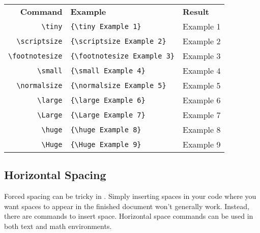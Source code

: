 \documentclass[letterpaper,twoside,10pt]{article}
\begin{document}
\begin{center}
 \begin{tabular}{rll}
  \small\textbf{Command} & \small\textbf{Example} & \small\textbf{Result}\\
\small\verb!\tiny! & \small\verb!{\tiny Example 1}! & {\tiny Example 1}\\
\small\verb!\scriptsize! & \small\verb!{\scriptsize Example 2}! & {\scriptsize Example 2}\\
\small\verb!\footnotesize! & \small\verb!{\footnotesize Example 3}! & {\footnotesize Example 3}\\
\small\verb!\small! & \small\verb!{\small Example 4}! & {\small Example 4}\\
\small\verb!\normalsize! & \small\verb!{\normalsize Example 5}! & {\normalsize Example 5}\\
\small\verb!\large! & \small\verb!{\large Example 6}! & {\large Example 6}\\
\small\verb!\Large! & \small\verb!{\Large Example 7}! & {\Large Example 7}\\
\small\verb!\huge! & \small\verb!{\huge Example 8}! & {\huge Example 8}\\
\small\verb!\Huge! & \small\verb!{\Huge Example 9}! & {\Huge Example 9}\\
 \end{tabular}
\end{center}



\subsection{Horizontal Spacing}

Forced spacing can be tricky in {\LaTeXe}. Simply inserting spaces in your code where you want spaces to appear in the finished document won't generally work. Instead, there are commands to insert space. Horizontal space commands can be used in both text and math environments.
\end{document}
